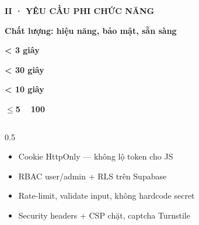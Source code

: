 \documentclass[aspectratio=169,10pt]{beamer}
\newcommand{\kick}[1]{{\headfont\bfseries\footnotesize\textcolor{mred}{\MakeUppercase{#1}}}}
\newcommand{\slidehead}[2]{%
  \kick{#1}\par\vspace{0.6mm}%
  {\headfont\bfseries\LARGE\textcolor{ink}{#2}}\par\vspace{1.2mm}}
\newcommand{\arr}{\textcolor{mred}{\,\raisebox{0.1ex}{$\rightarrow$}\,}}
\begin{document}
\begin{frame}
\slidehead{II · Yêu cầu phi chức năng}{Chất lượng: hiệu năng, bảo mật, sẵn sàng}
\vspace{0.5mm}
\begin{tcbraster}[raster columns=4, raster equal height=rows, raster column skip=2.5mm]
\begin{tcolorbox}[card,halign=flush left]{\headfont\bfseries\Large\color{mred}< 3 giây}\par\vspace{0.5mm}{\footnotesize\textcolor{slate}{Phản hồi UI tương tác}}\end{tcolorbox}
\begin{tcolorbox}[card,halign=flush left]{\headfont\bfseries\Large\color{ink}< 30 giây}\par\vspace{0.5mm}{\footnotesize\textcolor{slate}{Xử lý AI mỗi trang}}\end{tcolorbox}
\begin{tcolorbox}[card,halign=flush left]{\headfont\bfseries\Large\color{mblue}< 10 giây}\par\vspace{0.5mm}{\footnotesize\textcolor{slate}{Trả lời Q\&A}}\end{tcolorbox}
\begin{tcolorbox}[card,halign=flush left]{\headfont\bfseries\Large\color{gold}$\leq$5 \arr\ 100}\par\vspace{0.5mm}{\footnotesize\textcolor{slate}{Batch theo gói}}\end{tcolorbox}
\end{tcbraster}
\vspace{2mm}
\begin{columns}[t]
\begin{column}{0.5\textwidth}
\begin{tcolorbox}[creamcard,title={\textcolor{mred}{\rule{1.2mm}{3mm}}\ Bảo mật}]\footnotesize
\begin{itemize}\setlength\itemsep{1mm}
\item Cookie HttpOnly — không lộ token cho JS
\item RBAC user/admin + RLS trên Supabase
\item Rate-limit, validate input, không hardcode secret
\item Security headers + CSP chặt, captcha Turnstile

\end{itemize}
\end{tcolorbox}
\end{column}
\end{columns}
\end{frame}
\end{document}
